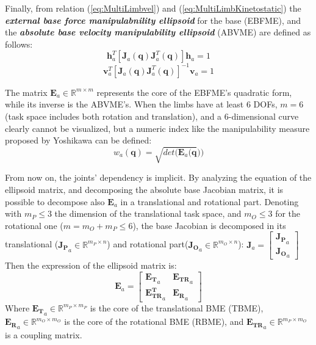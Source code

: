 Finally, from relation (\ref{eq:MultiLimbvel}) and (\ref{eq:MultiLimbKinetostatic}) the \textit{\textbf{external base force manipulabnility ellipsoid}} for the base (EBFME), and the \textit{\textbf{absolute base velocity manipulability ellipsoid}} (ABVME) are defined as follows: 
\begin{equation}
    \mathbf{h}^T_a [\mathbf{J}_a(\mathbf{q})\mathbf{J}^T_a(\mathbf{q})]\mathbf{h}_a = 1
    \label{eq:BEFME}
\end{equation}
\begin{equation}
    \mathbf{v}^T_a [\mathbf{J}_a(\mathbf{q})\mathbf{J}^T_a(\mathbf{q})]^{-1}\mathbf{v}_a = 1
    \label{eq:ABVME}
\end{equation}

The matrix $\mathbf{E}_a \in \mathbb{R}^{m\times m}$ represents the core of the EBFME's quadratic form, while its inverse is the ABVME's. 
When the limbs have at least 6 DOFs, $m = 6$ (task space includes both rotation and translation), and a 6-dimensional curve clearly cannot be visualized, but a numeric index like the manipulability measure proposed by Yoshikawa \cite{ManipulabilityYoshikawa} can be defined:
\begin{equation}
\label{eq:ManipulabilityMeasureBase}
    w_a(\mathbf{q}) = \sqrt{det(\mathbf{E}_a(\mathbf{q}}))
\end{equation}

From now on, the joints' dependency is implicit.
By analyzing the equation of the ellipsoid matrix, and decomposing the absolute base Jacobian matrix, it is possible to decompose also $\mathbf{E}_a$ in a translational and rotational part. Denoting with $m_P \leq 3$ the dimension of the translational task space, and $m_O \leq 3$ for the rotational one ($m = m_O + m_P \leq 6$), the base Jacobian is decomposed in its translational  ($\mathbf{J_P}_a \in \mathbb{R}^{m_P \times n}$) and rotational part($\mathbf{J_O}_a \in \mathbb{R}^{m_O \times n}$): 
$\textbf{J}_a = \begin{bmatrix}
    \mathbf{J_P}_a\\ \mathbf{J_O}_a
\end{bmatrix}$ 
Then the expression of the ellipsoid matrix is: 
\begin{equation}
\label{eq:BME_decoupled}
    \mathbf{E}_a = \begin{bmatrix}
        \mathbf{E_T}_a & \mathbf{E_{TR}}_a \\
        \mathbf{E^T_{TR}}_a & \mathbf{E_{R}}_a 
    \end{bmatrix}
\end{equation}
Where $\mathbf{E_T}_a \in \mathbb{R}^{m_P \times m_P}$ is the core of the translational BME (TBME),  
$\mathbf{E_R}_a \in \mathbb{R}^{m_O \times m_O}$
is the core of the rotational BME (RBME),
and $\mathbf{E_{TR}}_a \in \mathbb{R}^{m_P \times m_O}$ is a coupling matrix.

